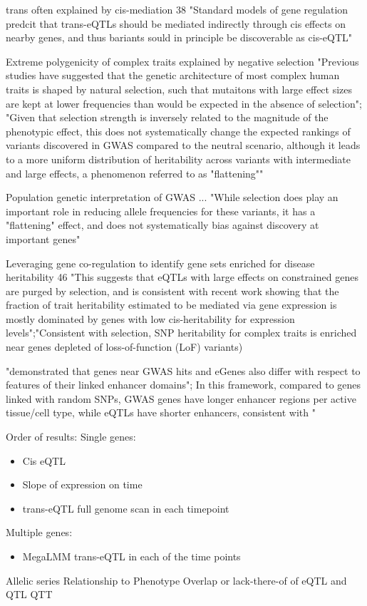 \documentclass[article,9pt,twocolumn,twoside]{rilabRxiv}
\begin{document}
\cite{Pierce} trans often explained by cis-mediation 38 "Standard models of gene regulation predcit that trans-eQTLs should be mediated indirectly through cis effects on nearby genes, and thus bariants sould in principle be discoverable as cis-eQTL"

\cite{O'Connor} Extreme polygenicity of complex traits explained by negative selection "Previous studies have suggested that the genetic architecture of most complex human traits is shaped by natural selection, such that mutaitons with large effect sizes are kept at lower frequencies than would be expected in the absence of selection"; "Given that selection strength is inversely related to the magnitude of the phenotypic effect, this
does not systematically change the expected rankings of variants discovered in GWAS compared
to the neutral scenario, although it leads to a more uniform distribution of heritability across variants with intermediate and large effects, a phenomenon referred to as "flattening""

\cite{Simons} Population genetic interpretation of GWAS ... "While
selection does play an important role in reducing allele frequencies for these variants, it has a "flattening" effect, and does not systematically bias against discovery at important genes"

\cite{Siewert-Rocks} Leveraging gene co-regulation to identify gene sets enriched for disease heritability 46 "This suggests that eQTLs with large effects on constrained genes are purged by selection, and is consistent with recent work showing that the fraction of trait heritability estimated to be mediated via gene expression is mostly dominated by genes with low cis-heritability for expression levels";"Consistent with selection, SNP heritability for complex traits is enriched near genes depleted of loss-of-function (LoF) variants)

\cite{WangGoldstein} "demonstrated that genes near GWAS hits and eGenes also differ with respect to features of their linked enhancer domains"; In this framework, compared to genes linked with random SNPs, GWAS genes have longer enhancer regions per active tissue/cell type, while eQTLs have shorter enhancers, consistent with "

Order of results:
Single genes:
\begin{itemize}
    \item Cis eQTL
    \item Slope of expression on time
    \item trans-eQTL full genome scan in each timepoint
\end{itemize}   
Multiple genes:
\begin{itemize}
    \item MegaLMM trans-eQTL in each of the time points
\end{itemize}
Allelic series
Relationship to Phenotype
Overlap or lack-there-of of eQTL and QTL
QTT
\end{document}
